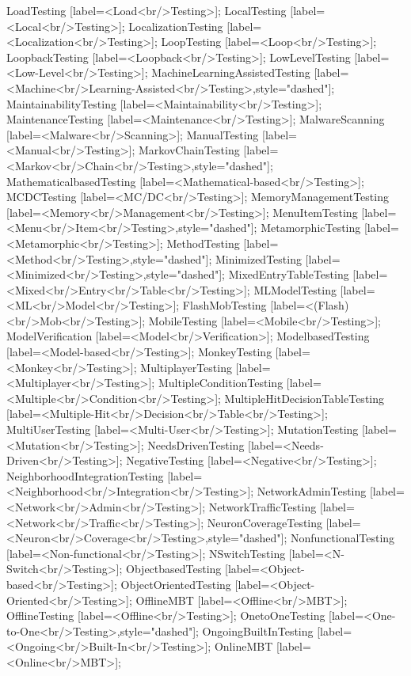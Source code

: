 \documentclass{article}
\begin{document}
{LoadTesting [label=<Load<br/>Testing>];
LocalTesting [label=<Local<br/>Testing>];
LocalizationTesting [label=<Localization<br/>Testing>];
LoopTesting [label=<Loop<br/>Testing>];
LoopbackTesting [label=<Loopback<br/>Testing>];
LowLevelTesting [label=<Low-Level<br/>Testing>];
MachineLearningAssistedTesting [label=<Machine<br/>Learning-Assisted<br/>Testing>,style="dashed"];
MaintainabilityTesting [label=<Maintainability<br/>Testing>];
MaintenanceTesting [label=<Maintenance<br/>Testing>];
MalwareScanning [label=<Malware<br/>Scanning>];
ManualTesting [label=<Manual<br/>Testing>];
MarkovChainTesting [label=<Markov<br/>Chain<br/>Testing>,style="dashed"];
MathematicalbasedTesting [label=<Mathematical-based<br/>Testing>];
MCDCTesting [label=<MC/DC<br/>Testing>];
MemoryManagementTesting [label=<Memory<br/>Management<br/>Testing>];
MenuItemTesting [label=<Menu<br/>Item<br/>Testing>,style="dashed"];
MetamorphicTesting [label=<Metamorphic<br/>Testing>];
MethodTesting [label=<Method<br/>Testing>,style="dashed"];
MinimizedTesting [label=<Minimized<br/>Testing>,style="dashed"];
MixedEntryTableTesting [label=<Mixed<br/>Entry<br/>Table<br/>Testing>];
MLModelTesting [label=<ML<br/>Model<br/>Testing>];
FlashMobTesting [label=<(Flash)<br/>Mob<br/>Testing>];
MobileTesting [label=<Mobile<br/>Testing>];
ModelVerification [label=<Model<br/>Verification>];
ModelbasedTesting [label=<Model-based<br/>Testing>];
MonkeyTesting [label=<Monkey<br/>Testing>];
MultiplayerTesting [label=<Multiplayer<br/>Testing>];
MultipleConditionTesting [label=<Multiple<br/>Condition<br/>Testing>];
MultipleHitDecisionTableTesting [label=<Multiple-Hit<br/>Decision<br/>Table<br/>Testing>];
MultiUserTesting [label=<Multi-User<br/>Testing>];
MutationTesting [label=<Mutation<br/>Testing>];
NeedsDrivenTesting [label=<Needs-Driven<br/>Testing>];
NegativeTesting [label=<Negative<br/>Testing>];
NeighborhoodIntegrationTesting [label=<Neighborhood<br/>Integration<br/>Testing>];
NetworkAdminTesting [label=<Network<br/>Admin<br/>Testing>];
NetworkTrafficTesting [label=<Network<br/>Traffic<br/>Testing>];
NeuronCoverageTesting [label=<Neuron<br/>Coverage<br/>Testing>,style="dashed"];
NonfunctionalTesting [label=<Non-functional<br/>Testing>];
NSwitchTesting [label=<N-Switch<br/>Testing>];
ObjectbasedTesting [label=<Object-based<br/>Testing>];
ObjectOrientedTesting [label=<Object-Oriented<br/>Testing>];
OfflineMBT [label=<Offline<br/>MBT>];
OfflineTesting [label=<Offline<br/>Testing>];
OnetoOneTesting [label=<One-to-One<br/>Testing>,style="dashed"];
OngoingBuiltInTesting [label=<Ongoing<br/>Built-In<br/>Testing>];
OnlineMBT [label=<Online<br/>MBT>];
}
\end{document}
